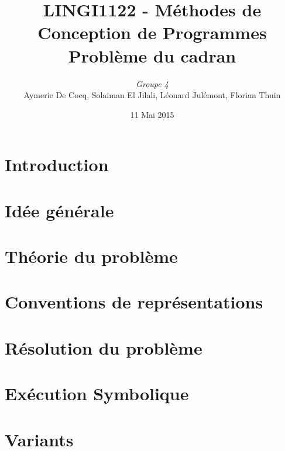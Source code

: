 \documentclass[11pt,a4paper]{article}
\author{\textit{Groupe 4}\\
Aymeric De Cocq, Solaiman El Jilali, Léonard Julémont, Florian Thuin}
\title{LINGI1122 - Méthodes de Conception de Programmes\\
Problème du cadran}
\date{11 Mai 2015}
\begin{document}
\maketitle

\section* {Introduction}


\section{Idée générale}


 
\section{Théorie du problème}


\section{Conventions de représentations}


\section{Résolution du problème}





\section{Exécution Symbolique}

\section{Variants}
\end{document}

